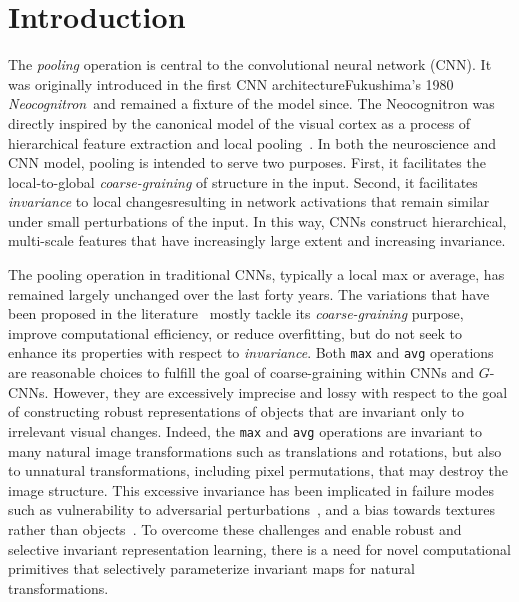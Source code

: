 \section{Introduction}


The \textit{pooling} operation is central to the convolutional neural network (CNN). It was originally introduced in the first CNN architecture\textemdash Fukushima's 1980 \textit{Neocognitron}~\cite{fukushima1980}\textemdash and remained a fixture of the model since. The Neocognitron was directly inspired by the canonical model of the visual cortex as a process of hierarchical feature extraction and local pooling~\cite{hubel1959receptive, adelson1985spatiotemporal}. In both the neuroscience and CNN model, pooling is intended to serve two purposes. First, it facilitates the local-to-global \textit{coarse-graining} of structure in the input. Second, it facilitates \textit{invariance} to local changes\textemdash resulting in network activations that remain similar under small perturbations of the input. In this way, CNNs construct hierarchical, multi-scale features that have increasingly large extent and increasing invariance.

The pooling operation in traditional CNNs, typically a local max or average, has remained largely unchanged over the last forty years. The variations that have been proposed in the literature~\cite{Nirthika2022,Zafar2022} mostly tackle its \textit{coarse-graining} purpose, improve computational efficiency, or reduce overfitting, but do not seek to enhance its properties with respect to \textit{invariance}. Both \texttt{max} and \texttt{avg} operations are reasonable choices to fulfill the goal of coarse-graining within CNNs and $G$-CNNs. However, they are excessively imprecise and lossy with respect to the goal of constructing robust representations of objects that are invariant only to irrelevant visual changes. Indeed, the \texttt{max} and \texttt{avg} operations are invariant to many natural image transformations such as translations and rotations, but also to unnatural transformations, including pixel permutations, that may destroy the image structure. This excessive invariance has been implicated in failure modes such as vulnerability to adversarial perturbations~\cite{goodfellow2014explaining,jacobsen2018excessive}, and a bias towards textures rather than objects~\cite{brendel2019approximating}. To overcome these challenges and enable robust and selective invariant representation learning, there is a need for novel computational primitives that selectively parameterize invariant maps for natural transformations.

